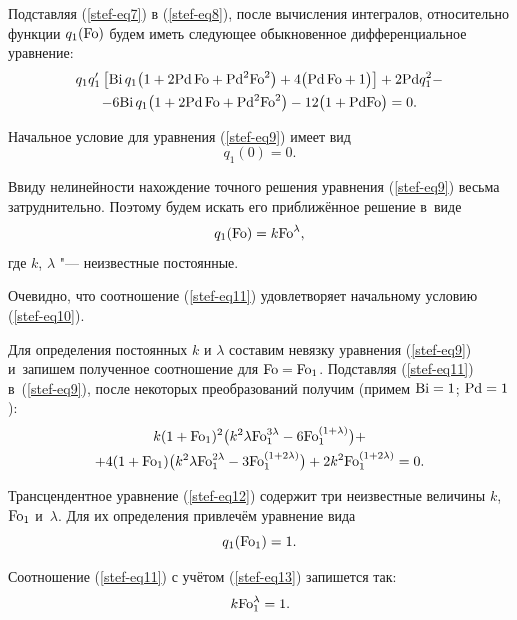Подставляя (\ref{stef-eq7}) в (\ref{stef-eq8}), после вычисления интегралов, относительно функции $q_1({\rm Fo})$ 
будем иметь следующее обыкновенное дифференциальное уравнение:
\begin{multline}
q_1{q}'_1 \left[ {\rm Bi}\, q_1 \bigl( 1+2{\rm Pd}\,{\rm Fo}+{\rm Pd}^2{\rm Fo}^2\bigr)
+
4\bigl({\rm Pd}\,{\rm Fo}+1 \bigr) 
\right]+
2{\rm Pd}q_1^2 -
\\
\label{stef-eq9}  
-6{\rm Bi}\, q_1 
\bigl( 1+2{\rm Pd}\,{\rm Fo}+{\rm Pd}^2{\rm Fo}^2 \bigr)-
12\bigl( 1+{\rm Pd}{\rm Fo} \bigr)=0.
\end{multline}

Начальное условие для уравнения (\ref{stef-eq9}) имеет вид
\begin{equation}
\label{stef-eq10}
q_1 (0)=0.
\end{equation}


Ввиду нелинейности нахождение точного решения уравнения (\ref{stef-eq9}) весьма 
затруднительно. Поэтому будем искать его приближённое решение в~виде
\begin{equation}
\label{stef-eq11}
q_1 ({\rm Fo})=k{\rm Fo}^\lambda,
\end{equation}
где $k$, $\lambda $ "--- неизвестные постоянные. 

Очевидно, что соотношение (\ref{stef-eq11}) удовлетворяет начальному условию (\ref{stef-eq10}). 

Для определения постоянных $k$ и $\lambda $ составим невязку уравнения (\ref{stef-eq9}) 
и~запишем полученное соотношение для ${\rm Fo}= {\rm Fo}_1$. 
Подставляя (\ref{stef-eq11}) в~(\ref{stef-eq9}), после некоторых преобразований получим 
(примем ${\rm Bi}=1$; ${\rm Pd}=1$):
\begin{multline}
k( 1+{\rm Fo}_1 )^2
\bigl( k^2\lambda {\rm Fo}_1^{3\lambda } -6{\rm Fo}_1^{(1+\lambda)}  \bigr)+
\\
\label{stef-eq12}
+4(1+{\rm Fo}_1)\bigl( k^2\lambda {\rm Fo}_1^{2\lambda} -
3{\rm Fo}_1^{(1+2\lambda )}  \bigr)+2k^2{\rm Fo}_1^{(1+2\lambda )} =0. 
\end{multline}


Трансцендентное уравнение (\ref{stef-eq12}) содержит три неизвестные величины $k$, ${\rm Fo}_1$ и~$\lambda $. Для их определения привлечём уравнение вида 
\begin{equation}
\label{stef-eq13}
q_1 ({\rm Fo}_1 )=1.
\end{equation}

Соотношение (\ref{stef-eq11}) с учётом (\ref{stef-eq13}) запишется так:
\begin{equation}
\label{stef-eq14}
k{\rm Fo}_1^\lambda =1.
\end{equation}

